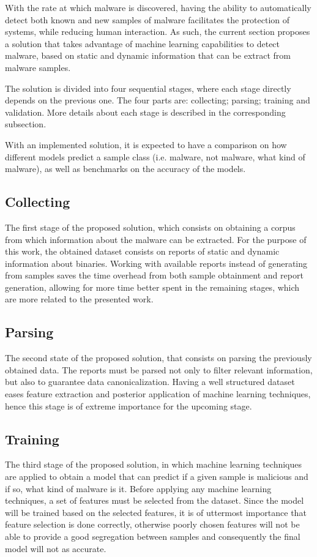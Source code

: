 \documentclass{llncs}
\begin{document}
With the rate at which malware is discovered, having the ability to automatically detect both known and new samples of malware facilitates the protection of systems, while reducing human interaction. As such, the current section proposes a solution that takes advantage of machine learning capabilities to detect malware, based on static and dynamic information that can be extract from malware samples.

The solution is divided into four sequential stages, where each stage directly depends on the previous one. The four parts are: collecting; parsing; training and validation. More details about each stage is described in the corresponding subsection.

With an implemented solution, it is expected to have a comparison on how different models predict a sample class (i.e. malware, not malware, what kind of malware), as well as benchmarks on the accuracy of the models.

\subsection{Collecting}
The first stage of the proposed solution, which consists on obtaining a corpus from which information about the malware can be extracted. For the purpose of this work, the obtained dataset consists on reports of static and dynamic information about binaries. Working with available reports instead of generating from samples saves the time overhead from both sample obtainment and report generation, allowing for more time better spent in the remaining stages, which are more related to the presented work.

\subsection{Parsing}
The second state of the proposed solution, that consists on parsing the previously obtained data. The reports must be parsed not only to filter relevant information, but also to guarantee data canonicalization. Having a well structured dataset eases feature extraction and posterior application of machine learning techniques, hence this stage is of extreme importance for the upcoming stage.

\subsection{Training}
The third stage of the proposed solution, in which machine learning techniques are applied to obtain a model that can predict if a given sample is malicious and if so, what kind of malware is it. Before applying any machine learning techniques, a set of features must be selected from the dataset. Since the model will be trained based on the selected features, it is of uttermost importance that feature selection is done correctly, otherwise poorly chosen features will not be able to provide a good segregation between samples and consequently the final model will not as accurate.
\end{document}
